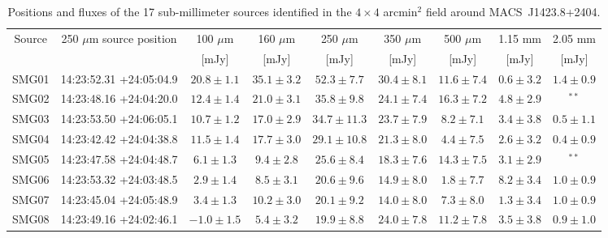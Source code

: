 \documentclass[twocolumn,traditabstract]{aa}
\begin{document}
\begin{table}[h]
\caption{Positions and fluxes of the 17 sub-millimeter sources identified in the $4 \times 4$ arcmin$^2$ field around \mbox{MACS~J1423.8+2404}.}
\begin{center}
\begin{tabular}{ccccccccc}
\hline
\hline
Source & 250 $\mu$m source position & 100 $\mu$m & 160 $\mu$m & 250 $\mu$m & 350 $\mu$m & 500 $\mu$m & 1.15 mm & 2.05 mm\\
 &  & [mJy] & [mJy] & [mJy] & [mJy] & [mJy] & [mJy] & [mJy]\\
\hline
SMG01 & 14:23:52.31 +24:05:04.9 & $    20.8 \pm      1.1$ & $    35.1 \pm      3.2$ & $    52.3 \pm      7.7$ & $    30.4 \pm      8.1$ & $    11.6 \pm      7.4$ & $     0.6 \pm      3.2$ & $     1.4 \pm      0.9$ \\
SMG02 & 14:23:48.16 +24:04:20.0 & $    12.4 \pm      1.4$ & $    21.0 \pm      3.1$ & $    35.8 \pm      9.8$ & $    24.1 \pm      7.4$ & $    16.3 \pm      7.2$ & $     4.8 \pm      2.9$ & $^{**}$ \\
SMG03 & 14:23:53.50 +24:06:05.1 & $    10.7 \pm      1.2$ & $    17.0 \pm      2.9$ & $    34.7 \pm     11.3$ & $    23.7 \pm      7.9$ & $     8.2 \pm      7.1$ & $     3.4 \pm      3.8$ & $     0.5 \pm      1.1$ \\
SMG04 & 14:23:42.42 +24:04:38.8 & $    11.5 \pm      1.4$ & $    17.7 \pm      3.0$ & $    29.1 \pm     10.8$ & $    21.3 \pm      8.0$ & $     4.4 \pm      7.5$ & $     2.6 \pm      3.2$ & $     0.4 \pm      0.9$ \\
SMG05 & 14:23:47.58 +24:04:48.7 & $     6.1 \pm      1.3$ & $     9.4 \pm      2.8$ & $    25.6 \pm      8.4$ & $    18.3 \pm      7.6$ & $    14.3 \pm      7.5$ & $     3.1 \pm      2.9$ & $^{**}$ \\
SMG06 & 14:23:53.32 +24:03:48.5 & $     2.9 \pm      1.4$ & $     8.5 \pm      3.1$ & $    20.6 \pm      9.6$ & $    14.9 \pm      8.0$ & $     1.8 \pm      7.7$ & $     8.2 \pm      3.4$ & $     1.0 \pm      0.9$ \\
SMG07 & 14:23:45.04 +24:05:48.9 & $     3.4 \pm      1.3$ & $    10.2 \pm      3.0$ & $    20.1 \pm      9.2$ & $    14.0 \pm      8.0$ & $     7.3 \pm      8.0$ & $     1.3 \pm      3.4$ & $     1.0 \pm      0.9$ \\
SMG08 & 14:23:49.16 +24:02:46.1 & $    -1.0 \pm      1.5$ & $     5.4 \pm      3.2$ & $    19.9 \pm      8.8$ & $    24.0 \pm      7.8$ & $    11.2 \pm      7.8$ & $     3.5 \pm      3.8$ & $     0.9 \pm      1.0$ \\

\end{tabular}
\end{center}
\end{table}
\end{document}

